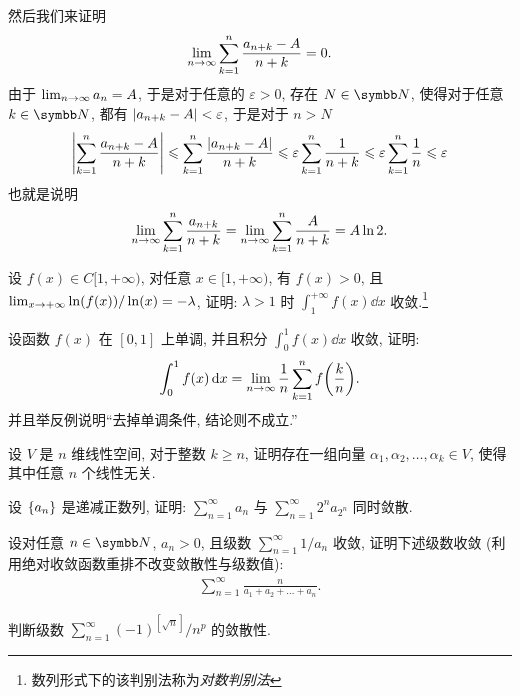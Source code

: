 \begin{exercise}[series=exer]
\begin{answer}
        然后我们来证明 
        \begin{align*}
            \lim_{n \to \infty}\sum_{k = 1}^{n} \frac{a_{n + k} - A}{n + k} = 0.
        \end{align*}
        由于 $ \lim_{n \to \infty}a_{n} = A $, 于是对于任意的 $ \varepsilon > 0 $, 存在 $ N \in \N $, 使得对于任意 $ k \in \N $, 都有 $ \abs{a_{n + k} - A} < \varepsilon $, 于是对于 $ n > N $ 
        \begin{align*}
            \abs{\sum_{k = 1}^{n} \frac{a_{n + k} - A}{n + k}} \leqslant \sum_{k = 1}^{n} \frac{\abs{a_{n + k} - A}}{n + k} \leqslant \varepsilon \sum_{k = 1}^{n} \frac{1}{n + k} \leqslant \varepsilon\sum_{k = 1}^{n} \frac{1}{n} \leqslant \varepsilon
        \end{align*}
        也就是说明 
        \begin{align*}
            \lim_{n \to \infty} \sum_{k = 1}^{n}\frac{a_{n + k}}{n + k} = \lim_{n \to \infty} \sum_{k = 1}^{n}\frac{A}{n + k} = A\ln 2.
        \end{align*}
    \end{answer}
    \item 设 $ f(x) \in C[1, +\infty) $, 对任意 $ x\in [1, +\infty) $, 有 $ f(x) > 0 $, 且 $ \lim_{x \to +\infty} \ln(f(x))/\ln(x) = -\lambda $, 证明: $ \lambda > 1 $ 时 $ \int_{1}^{+\infty} f(x) \dd{x} $ 收敛.\footnote{数列形式下的该判别法称为\emph{对数判别法}}
    \item 设函数 $ f(x) $ 在 $ [0, 1] $ 上单调, 并且积分 $ \int_{0}^{1} f(x) \dd{x} $ 收敛, 证明:
    \begin{align*}
        \int_{0}^{1} f(x) \dd{x} = \lim_{n \to \infty} \frac{1}{n} \sum_{k=1}^{n} f\qty(\frac{k}{n}).
    \end{align*}
    并且举反例说明``去掉单调条件, 结论则不成立.''
    \item 设 $ V $ 是 $ n $ 维线性空间, 对于整数 $ k \ge n $, 证明存在一组向量 $ \alpha_{1}, \alpha_{2}, \dots, \alpha_{k} \in V $, 使得其中任意 $ n $ 个线性无关.
    \item 设 $ \qty{a_{n}} $ 是递减正数列, 证明: $ \sum_{n=1}^{\infty}a_{n} $ 与 $ \sum_{n=1}^{\infty}2^{n}a_{2^{n}} $ 同时敛散.
    \item 设对任意 $ n\in \N $, $ a_{n} > 0 $, 且级数 $ \sum_{n=1}^{\infty}1/a_{n} $ 收敛, 证明下述级数收敛 (利用绝对收敛函数重排不改变敛散性与级数值):
    \begin{align*}
        \sum_{n=1}^{\infty}\frac{n}{a_{1} + a_{2} + \dots + a_{n}}.
    \end{align*}
    \item 判断级数 $ \sum_{n=1}^{\infty} (-1)^{[\sqrt{n}]}/n^{p} $ 的敛散性.

\end{exercise}
